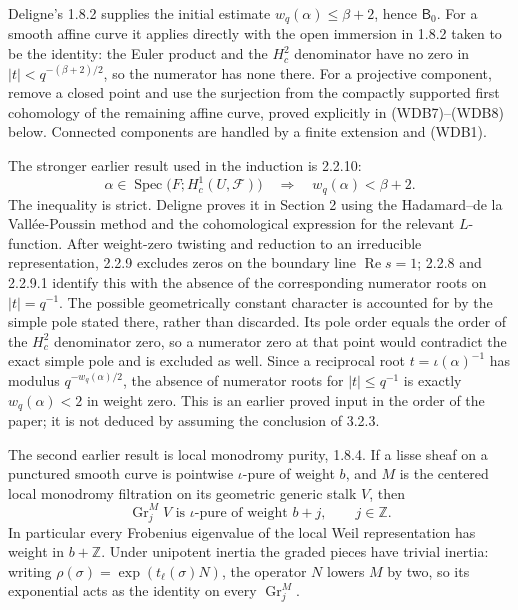 Deligne's 1.8.2 supplies the initial estimate
\(w_q(\alpha)\le\beta+2\), hence \(\mathsf B_0\).
For a smooth affine curve it applies directly with the open immersion
in 1.8.2 taken to be the identity: the Euler product and the
\(H_c^2\) denominator have no zero in
\(|t|<q^{-(\beta+2)/2}\), so the numerator has none there.
For a projective component, remove a closed point and use the
surjection from the compactly supported first cohomology of the
remaining affine curve, proved explicitly in (WDB7)--(WDB8) below.
Connected components are handled by a finite extension and (WDB1).

The stronger earlier result used in the induction is 2.2.10:
\[
 \alpha\in\operatorname{Spec}
   \bigl(F;H_c^1(U,\mathcal F)\bigr)
 \quad\Longrightarrow\quad w_q(\alpha)<\beta+2.
 \tag{WDB4}
\]
The inequality is strict. Deligne proves it in Section 2 using the
Hadamard--de la Vall\'ee-Poussin method and the cohomological expression
for the relevant \(L\)-function. After weight-zero twisting and
reduction to an irreducible representation, 2.2.9 excludes zeros on
the boundary line \(\operatorname{Re}s=1\); 2.2.8 and 2.2.9.1
identify this with the absence of the corresponding numerator roots
on \(|t|=q^{-1}\). The possible geometrically constant character is
accounted for by the simple pole stated there, rather than discarded.
Its pole order equals the order of the \(H_c^2\) denominator zero,
so a numerator zero at that point would contradict the exact simple
pole and is excluded as well.
Since a reciprocal root \(t=\iota(\alpha)^{-1}\) has modulus
\(q^{-w_q(\alpha)/2}\), the absence of numerator roots for
\(|t|\le q^{-1}\) is exactly \(w_q(\alpha)<2\) in weight zero.
This is an earlier proved input in the order of the paper; it is not
deduced by assuming the conclusion of 3.2.3.

The second earlier result is local monodromy purity, 1.8.4. If a lisse
sheaf on a punctured smooth curve is pointwise \(\iota\)-pure of
weight \(b\), and \(M\) is the centered local monodromy filtration
on its geometric generic stalk \(V\), then
\[
 \operatorname{Gr}_j^M V\text{ is }\iota\text{-pure of weight }b+j,
 \qquad j\in\mathbb Z.
 \tag{WDB5}
\]
In particular every Frobenius eigenvalue of the local Weil
representation has weight in \(b+\mathbb Z\). Under unipotent
inertia the graded pieces have trivial inertia: writing
\(\rho(\sigma)=\exp(t_\ell(\sigma)N)\), the operator \(N\)
lowers \(M\) by two, so its exponential acts as the identity on
every \(\operatorname{Gr}_j^M\).

